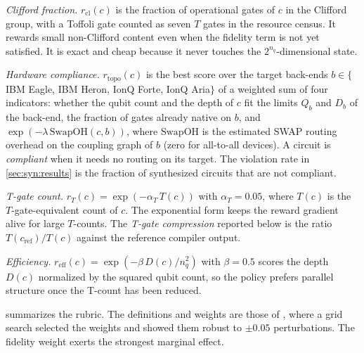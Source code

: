 \emph{Clifford fraction.} $r_{\mathrm{cl}}(c)$ is the fraction of operational gates of $c$ in the Clifford group, with a Toffoli gate counted as seven $T$ gates in the resource census. It rewards small non-Clifford content even when the fidelity term is not yet satisfied. It is exact and cheap because it never touches the $2^{n_q}$-dimensional state.

\emph{Hardware compliance.} $r_{\mathrm{topo}}(c)$ is the best score over the target back-ends $b\in\{$IBM Eagle, IBM Heron, IonQ Forte, IonQ Aria$\}$ of a weighted sum of four indicators: whether the qubit count and the depth of $c$ fit the limits $Q_b$ and $D_b$ of the back-end, the fraction of gates already native on $b$, and $\exp(-\lambda\,\mathrm{SwapOH}(c,b))$, where $\mathrm{SwapOH}$ is the estimated SWAP routing overhead on the coupling graph of $b$ (zero for all-to-all devices). A circuit is \emph{compliant} when it needs no routing on its target. The violation rate in \cref{sec:syn:results} is the fraction of synthesized circuits that are not compliant.

\emph{T-gate count.} $r_{T}(c)=\exp(-\alpha_T\,T(c))$ with $\alpha_T=0.05$, where $T(c)$ is the $T$-gate-equivalent count of $c$. The exponential form keeps the reward gradient alive for large $T$-counts. The \emph{T-gate compression} reported below is the ratio $T(c_{\mathrm{ref}})/T(c)$ against the reference compiler output.

\emph{Efficiency.} $r_{\mathrm{eff}}(c)=\exp(-\beta\,D(c)/n_q^{2})$ with $\beta=0.5$ scores the depth $D(c)$ normalized by the squared qubit count, so the policy prefers parallel structure once the T-count has been reduced.

 summarizes the rubric. The definitions and weights are those of \cite{guo2026rubriq}, where a grid search selected the weights and showed them robust to $\pm0.05$ perturbations. The fidelity weight exerts the strongest marginal effect.

